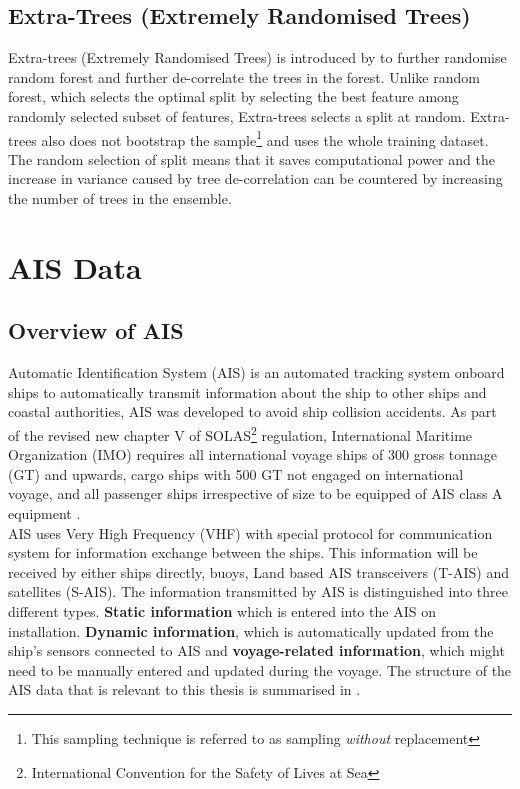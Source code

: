 \subsection{Extra-Trees (Extremely Randomised Trees)}\label{sec:et_theo}

Extra-trees (Extremely Randomised Trees) is introduced by  to further randomise random forest and further de-correlate the trees in the forest. Unlike random forest, which selects the optimal split by selecting the best feature among randomly selected subset of features, Extra-trees selects a split at random. Extra-trees also does not bootstrap the sample\footnote{This sampling technique is referred to as sampling \emph{without} replacement} and uses the whole training dataset. The random selection of split means that it saves computational power and the increase in variance caused by tree de-correlation can be countered by increasing the number of trees in the ensemble.\\ 

\section{AIS Data}\label{sec:ais_theo}

\subsection{Overview of AIS}

Automatic Identification System (AIS) is an automated tracking system onboard ships to automatically transmit information about the ship to other ships and coastal authorities, AIS was developed to avoid ship collision accidents. As part of the revised new chapter V of SOLAS\footnote{International Convention for the Safety of Lives at Sea} regulation, International Maritime Organization (IMO) requires all international voyage ships of 300 gross tonnage (GT) and upwards, cargo ships with 500 GT not engaged on international voyage, and all passenger ships irrespective of size to be equipped of AIS class A equipment .\\

AIS uses Very High Frequency (VHF) with special protocol for communication system for information exchange between the ships. This information will be received by either ships directly, buoys, Land based AIS transceivers (T-AIS) and satellites (S-AIS). The information transmitted by AIS is distinguished into three different types. \textbf{Static information} which is entered into the AIS on installation. \textbf{Dynamic information}, which is automatically updated from the ship's sensors connected to AIS and \textbf{voyage-related information}, which might need to be manually entered and updated during the voyage. The structure of the AIS data that is relevant to this thesis is summarised in .\\


